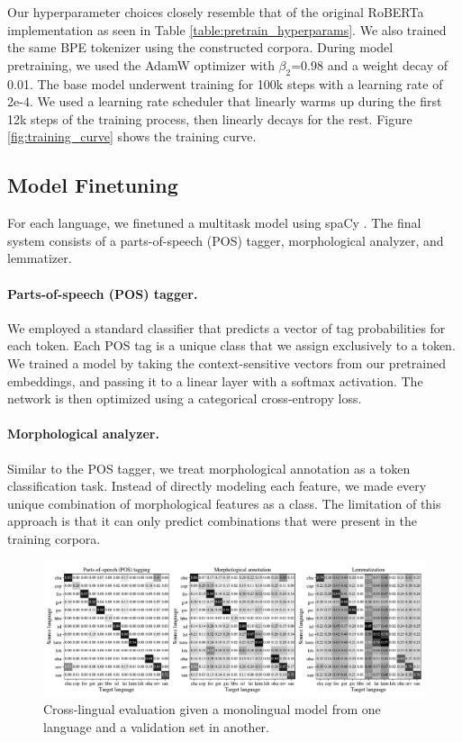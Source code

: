 \documentclass[11pt]{article}
\begin{document}


Our hyperparameter choices closely resemble that of the original RoBERTa implementation as seen in Table \ref{table:pretrain_hyperparams}.
We also trained the same BPE tokenizer \citep{sennrich-etal-2016-neural} using the constructed corpora.
During model pretraining, we used the AdamW optimizer with $\beta_2$=0.98 and a weight decay of 0.01.
The base model underwent training for 100k steps with a learning rate of 2e-4.
We used a learning rate scheduler that linearly warms up during the first 12k steps of the training process, then linearly decays for the rest.
Figure \ref{fig:training_curve} shows the training curve.

\subsection{Model Finetuning}

For each language, we finetuned a multitask model using spaCy \cite{honnibal-etal-2020-spacy}. 
The final system consists of a parts-of-speech (POS) tagger, morphological analyzer, and lemmatizer.

\paragraph{Parts-of-speech (POS) tagger.}
We employed a standard classifier that predicts a vector of tag probabilities for each token.
Each POS tag is a unique class that we assign exclusively to a token.
We trained a model by taking the context-sensitive vectors from our pretrained embeddings, and passing it to a linear layer with a softmax activation.
The network is then optimized using a categorical cross-entropy loss.

\paragraph{Morphological analyzer.}
Similar to the POS tagger, we treat morphological annotation as a token classification task.
Instead of directly modeling each feature, we made every unique combination of morphological features as a class.
The limitation of this approach is that it can only predict combinations that were present in the training corpora.

\begin{figure}[t]
\centering
\includegraphics[width=\textwidth]{figures/cross_lingual.pdf}
\caption{Cross-lingual evaluation given a monolingual model from one language and a validation set in another.}
\label{fig:cross_lingual}
\end{figure}
\end{document}
